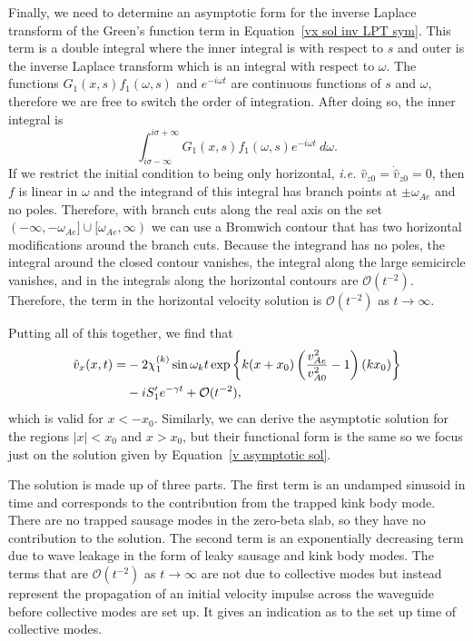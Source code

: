 \documentclass[12pt]{../style-files/ociamthesis}
\begin{document}
Finally, we need to determine an asymptotic form for the inverse Laplace transform of the Green's function term in Equation~\eqref{vx sol inv LPT sym}. This term is a double integral where the inner integral is with respect to $s$ and outer is the inverse Laplace transform which is an integral with respect to $\omega$. The functions $G_1(x, s)f_1(\omega, s)$ and $e^{-i\omega t}$ are continuous functions of $s$ and $\omega$, therefore we are free to switch the order of integration. After doing so, the inner integral is
\begin{equation}
\int_{i\sigma - \infty}^{i\sigma 
+ \infty} G_1(x, s)f_1(\omega, s) e^{-i\omega t} ~d\omega.
\end{equation}
If we restrict the initial condition to being only horizontal, \textit{i.e.} $\hat{v}_{z0} = \dot{\hat{v}}_{z0} = 0$, then $f$ is linear in $\omega$ and the integrand of this integral has branch points at $\pm \omega_{Ae}$ and no poles. Therefore, with branch cuts along the real axis on the set $(-\infty, -\omega_{Ae}] \cup [\omega_{Ae}, \infty)$ we can use a Bromwich contour that has two horizontal modifications around the branch cuts. Because the integrand has no poles, the integral around the closed contour vanishes, the integral along the large semicircle vanishes, and in the integrals along the horizontal contours are $\mathcal{O}(t^{-2})$. Therefore, the term in the horizontal velocity solution is $\mathcal{O}(t^{-2})$ as $t \to \infty$.

Putting all of this together, we find that
\begin{align}
\hat{v}_x(x, t) = &-2\chi_1^{(k)}\sin{\omega_k t}\exp\left\{ k(x + x_0)\left( \frac{v_{Ae}^2}{v_{A0}^2} - 1 \right) (kx_0) \right\} \notag \\
&- iS'_1 e^{-\gamma t} + \mathcal{O}(t^{-2}),
\label{v asymptotic sol}
\end{align}
which is valid for $x < -x_0$. Similarly, we can derive the asymptotic solution for the regions $|x| < x_0$ and $x > x_0$, but their functional form is the same so we focus just on the solution given by Equation~\eqref{v asymptotic sol}.

The solution is made up of three parts. The first term is an undamped sinusoid in time and corresponds to the contribution from the trapped kink body mode. There are no trapped sausage modes in the zero-beta slab, so they have no contribution to the solution. The second term is an exponentially decreasing term due to wave leakage in the form of leaky sausage and kink body modes. The terms that are $\mathcal{O}(t^{-2})$ as $t \to \infty$ are not due to collective modes but instead represent the propagation of an initial velocity impulse across the waveguide before collective modes are set up. It gives an indication as to the set up time of collective modes.
\end{document}
